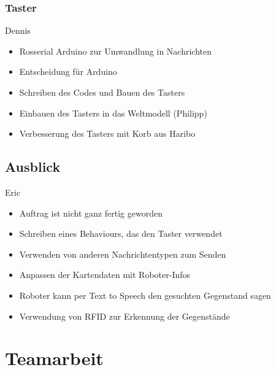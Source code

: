 \documentclass[a4paper,12pt,headsepline]{scrartcl}
\begin{document}
			\subsubsection{Taster}
			Dennis\\
			\begin{itemize}
				\item Rosserial Arduino zur Umwandlung in Nachrichten
				\item Entscheidung für Arduino
				\item Schreiben des Codes und Bauen des Tasters
				\item Einbauen des Tasters in das Weltmodell (Philipp)
				\item Verbesserung des Tasters mit Korb aus Haribo
			\end{itemize}
	
	\subsection{Ausblick}
	Eric \\
	\begin{itemize}
		\item Auftrag ist nicht ganz fertig geworden
		\item Schreiben eines Behaviours, das den Taster verwendet
		\item Verwenden von anderen Nachrichtentypen zum Senden
		\item Anpassen der Kartendaten mit Roboter-Infos
		\item Roboter kann per Text to Speech den gesuchten Gegenstand sagen
		\item Verwendung von RFID zur Erkennung der Gegenstände
	\end{itemize}
	\newpage
	\section{Teamarbeit}
	
\end{document}
